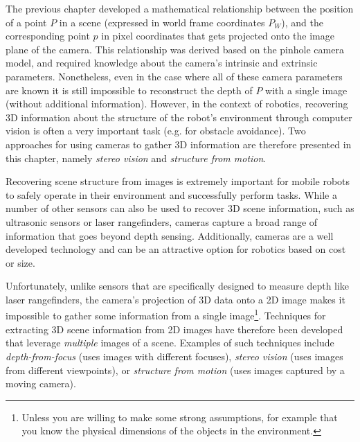 The previous chapter developed a mathematical relationship between the position of a point $P$ in a scene (expressed in world frame coordinates $P_W$), and the corresponding point $p$ in pixel coordinates that gets projected onto the image plane of the camera. This relationship was derived based on the pinhole camera model, and required knowledge about the camera's intrinsic and extrinsic parameters. Nonetheless, even in the case where all of these camera parameters are known it is still impossible to reconstruct the depth of $P$ with a single image (without additional information).
However, in the context of robotics, recovering 3D information about the structure of the robot's environment through computer vision is often a very important task (e.g. for obstacle avoidance). Two approaches for using cameras to gather 3D information are therefore presented in this chapter, namely \textit{stereo vision} and \textit{structure from motion}\cite{SiegwartNourbakhshEtAl2011}\cite{ForsythPonce2011}.


Recovering scene structure from images is extremely important for mobile robots to safely operate in their environment and successfully perform tasks. While a number of other sensors can also be used to recover 3D scene information, such as ultrasonic sensors or laser rangefinders, cameras capture a broad range of information that goes beyond depth sensing. Additionally, cameras are a well developed technology and can be an attractive option for robotics based on cost or size.

Unfortunately, unlike sensors that are specifically designed to measure depth like laser rangefinders, the camera's projection of 3D data onto a 2D image makes it impossible to gather some information from a single image\footnote{Unless you are willing to make some strong assumptions, for example that you know the physical dimensions of the objects in the environment.}. Techniques for extracting 3D scene information from 2D images have therefore been developed that leverage \textit{multiple} images of a scene. Examples of such techniques include \textit{depth-from-focus} (uses images with different focuses), \textit{stereo vision} (uses images from different viewpoints), or \textit{structure from motion} (uses images captured by a moving camera).


